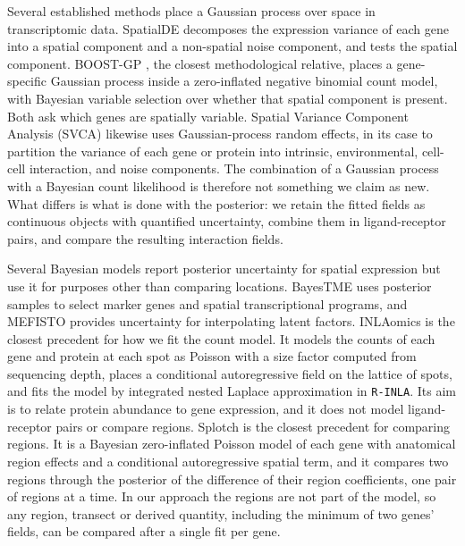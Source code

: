 \documentclass[10pt,letterpaper]{article}
\begin{document}
Several established methods place a Gaussian process over space in transcriptomic data. SpatialDE \cite{Svensson2018} decomposes the expression variance of each gene into a spatial component and a non-spatial noise component, and tests the spatial component. BOOST-GP \cite{Li2021}, the closest methodological relative, places a gene-specific Gaussian process inside a zero-inflated negative binomial count model, with Bayesian variable selection over whether that spatial component is present. Both ask which genes are spatially variable. Spatial Variance Component Analysis (SVCA) \cite{Arnol2019} likewise uses Gaussian-process random effects, in its case to partition the variance of each gene or protein into intrinsic, environmental, cell-cell interaction, and noise components. The combination of a Gaussian process with a Bayesian count likelihood is therefore not something we claim as new. What differs is what is done with the posterior: we retain the fitted fields as continuous objects with quantified uncertainty, combine them in ligand-receptor pairs, and compare the resulting interaction fields.

Several Bayesian models report posterior uncertainty for spatial expression but use it for purposes other than comparing locations. BayesTME \cite{zhang2023bayestme} uses posterior samples to select marker genes and spatial transcriptional programs, and MEFISTO \cite{velten2022mefisto} provides uncertainty for interpolating latent factors. INLAomics \cite{arnroth2025inlaomics} is the closest precedent for how we fit the count model. It models the counts of each gene and protein at each spot as Poisson with a size factor computed from sequencing depth, places a conditional autoregressive field on the lattice of spots, and fits the model by integrated nested Laplace approximation in \texttt{R-INLA}. Its aim is to relate protein abundance to gene expression, and it does not model ligand-receptor pairs or compare regions. Splotch \cite{aijo2019splotch} is the closest precedent for comparing regions. It is a Bayesian zero-inflated Poisson model of each gene with anatomical region effects and a conditional autoregressive spatial term, and it compares two regions through the posterior of the difference of their region coefficients, one pair of regions at a time. In our approach the regions are not part of the model, so any region, transect or derived quantity, including the minimum of two genes' fields, can be compared after a single fit per gene.
\end{document}
